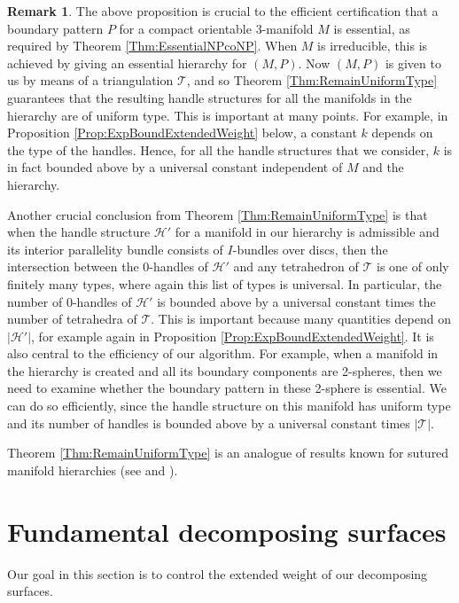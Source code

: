 \documentclass[oneside]{amsart}
\numberwithin{equation}{section}
\theoremstyle{plain}
\theoremstyle{definition}
\newtheorem{remark}[equation]{Remark}
\newcommand{\calT}{{\mathcal{T}}}
\newcommand{\calH}{\mathcal{H}}
\begin{document}
\begin{remark}
The above proposition is crucial to the efficient certification that a boundary pattern $P$ for a compact orientable 3-manifold $M$ is essential, as required by Theorem \ref{Thm:EssentialNPcoNP}. When $M$ is irreducible, this is achieved by giving an essential hierarchy for $(M, P)$. Now $(M,P)$ is given to us by means of a triangulation $\calT$,
and so Theorem \ref{Thm:RemainUniformType} guarantees that the resulting handle structures for all the manifolds in the hierarchy are of uniform type. This is important
at many points. For example, in Proposition \ref{Prop:ExpBoundExtendedWeight} below, a constant $k$ depends on the type of the handles. Hence, for all the handle structures that we consider, $k$ is in fact bounded above by a universal constant independent of $M$ and the hierarchy.

Another crucial conclusion from Theorem \ref{Thm:RemainUniformType} is that when the handle structure $\calH'$ for a manifold in our hierarchy is admissible and its interior parallelity bundle consists of $I$-bundles over discs, then the intersection between the 0-handles of $\calH'$ and any tetrahedron of $\calT$ is one of only finitely many types, where again this list of types is universal. In particular, the number of 0-handles of $\calH'$ is bounded above by a universal constant times the number of tetrahedra of $\calT$. This is important because many quantities depend on $|\calH'|$, for example again in Proposition \ref{Prop:ExpBoundExtendedWeight}. It is also central to the efficiency of our algorithm. For example, when a manifold in the hierarchy is created and all its boundary components are 2-spheres, then we need to examine whether the boundary pattern in these 2-sphere is essential. We can do so efficiently, since the handle structure on this manifold has uniform type and its number of handles is bounded above by a universal constant times $|\calT|$.

Theorem \ref{Thm:RemainUniformType} is an analogue of results known for sutured manifold hierarchies (see \cite[Proposition 6.3]{Lackenby:Exceptional} and \cite[Theorem 6.1]{Lackenby:EfficientCertification}).
\end{remark}

\section{Fundamental decomposing surfaces}
\label{Sec:Fundamental}

Our goal in this section is to control the extended weight of our decomposing surfaces.
\end{document}
